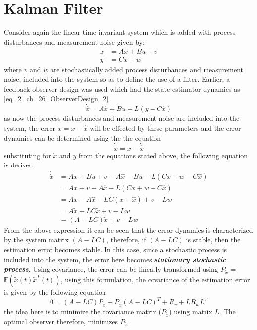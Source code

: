 \section{Kalman Filter}

Consider again the linear time invariant system which is added with process disturbances and measurement noise given by:
\begin{align}
	\dot{x} &= Ax + Bu + v \\
	y &= Cx + w
\end{align}
where $v$ and $w$ are stochastically added process disturbances and measurement noise, included into the system so as to define the use of a filter. Earlier, a feedback observer design was used which had the state estimator dynamics as \eqref{eq_2_ch_26_ObserverDesign_2}
\begin{equation}
	\dot{\hat{x}} = A\hat{x} + Bu + L(y - C\hat{x})
\end{equation}
as now the process disturbances and measurement noise are included into the system, the error $\tilde{x} = x - \hat{x}$ will be effected by these parameters and the error dynamics can be determined using the the equation
\begin{equation}
	\dot{\tilde{x}} = \dot{x} - \dot{\hat{x}}
\end{equation}
substituting for $\dot{x}$ and $y$ from the equations stated above, the following equation is derived
\begin{align*}
	\dot{\tilde{x}} &= Ax + Bu + v - A\hat{x} - Bu - L(Cx + w - C\hat{x}) \\
					&= Ax + v - A\hat{x} - L(Cx + w - C\hat{x}) \\
					&= Ax - A\hat{x} - LC(x - \hat{x}) + v - Lw \\
					&= A\tilde{x} - LC\tilde{x} + v - Lw \\
					&= (A - LC)\tilde{x} + v - Lw 
\end{align*}
From the above expression it can be seen that the error dynamics is characterized by the system matrix $(A - LC)$, therefore, if $(A - LC)$ is stable, then the estimation error becomes stable. In this case, since a stochastic process is included into the system, the error here becomes \textbf{\textit{stationary stochastic process}}. Using covariance, the error can be linearly transformed using $P_{\tilde{x}}$ = $\mathbb{E}(\tilde{x}(t)\tilde{x}^{T}(t))$, using this formulation, the covariance of the estimation error is given by the following equation
\begin{equation}
	0 = (A - LC)P_{\tilde{x}} + P_{\tilde{x}}(A - LC)^{T} + R_{v} + L R_{w}L^{T}
\end{equation}
the idea here is to minimize the covariance matrix ($P_{\tilde{x}}$) using matrix $L$. The optimal observer therefore, minimizes $P_{\tilde{x}}$.

